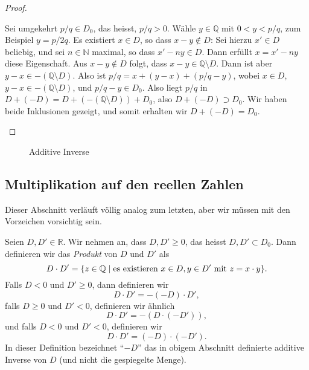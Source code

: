 \documentclass[../main.tex]{subfiles}
\begin{document}
\begin{proof}
\begin{itemize}
      Sei umgekehrt
      $p/q \in D_{0}$, das heisst, $p/q > 0$. Wähle $y \in \mathbb Q$
      mit $0 < y < p/q$, zum Beispiel $y = p/2q$.
      Es existiert $x \in D$, so dass $x - y \notin D$:
      Sei hierzu $x' \in D$ beliebig, und sei $n \in \mathbb N$ maximal,
      so dass $x' -ny \in D$. Dann erfüllt $x = x' - ny$ diese Eigenschaft.
      Aus $x - y \notin D$ folgt, dass $x- y \in \mathbb Q \setminus D$.
      Dann ist aber $y - x \in - (\mathbb Q \setminus D)$.
      Also ist $p/q = x + (y-x) + (p/q - y)$, wobei
      $x \in D$, $y - x \in -(\mathbb Q \setminus D)$, und $p/q - y \in D_{0}$.
      Also liegt $p/q$ in $D + (-D) = D + (-(\mathbb Q \setminus D)) + D_{0}$,
      also $D + (-D) \supset D_{0}$. Wir haben beide Inklusionen gezeigt,
      und somit
      erhalten wir $D + (-D) = D_{0}$. \qedhere
  \end{itemize}
\end{proof}

\begin{figure}[htb]
  \centering
  \begin{minipage}{0.4\linewidth}
    \centering
    
  \end{minipage}%
  \begin{minipage}{0.4\linewidth}
    \centering
    
  \end{minipage}
  \begin{minipage}{0.4\linewidth}
    \centering
    
  \end{minipage}%
  \begin{minipage}{0.4\linewidth}
    \centering
    
  \end{minipage}
  \caption{Additive Inverse}%
  \label{fig:additiv-dedekind}
\end{figure}

\subsection*{Multiplikation auf den reellen Zahlen}
Dieser Abschnitt verläuft völlig analog zum letzten,
aber wir müssen mit den Vorzeichen vorsichtig sein.

\begin{definition}
Seien
$D ,D' \in \mathbb R$. Wir nehmen an, dass $D, D' \geq 0$,
das heisst $D, D' \subset D_{0}$. Dann definieren wir das \emph{Produkt}
von $D$ und $D'$ als
\[D \cdot D' = \{z \in \mathbb Q \mid \textup{es existieren } x \in D,
  y \in D' \textup{ mit } z = x \cdot y\}.\]
Falls $D < 0$ und $D' \geq 0$, dann definieren wir
\[D \cdot D' = -(-D) \cdot D',\]
falls $D \geq 0$ und $D' < 0$, definieren wir ähnlich
\[D \cdot D' = -(D \cdot (-D')),\]
und falls $D < 0$ und $D' < 0$, definieren wir
\[D \cdot D' = (-D) \cdot (-D').\]
In dieser Definition bezeichnet ``$-D$'' das in obigem Abschnitt
definierte additive Inverse von $D$ (und nicht die gespiegelte Menge).
\end{definition}
\end{document}
